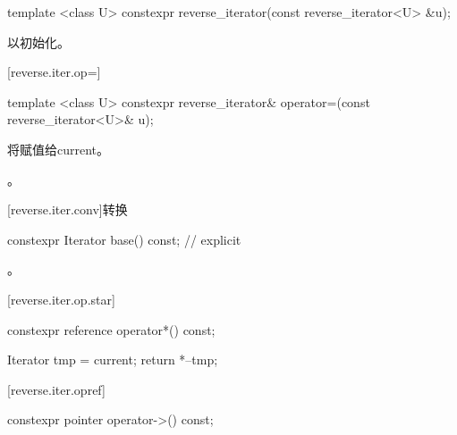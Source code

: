 \begin{itemdecl}
template <class U> constexpr reverse_iterator(const reverse_iterator<U> &u);
\end{itemdecl}

\begin{itemdescr}
\pnum
\effects
以初始化。
\end{itemdescr}

[reverse.iter.op=]{}

%
\begin{itemdecl}
template <class U>
constexpr reverse_iterator&
  operator=(const reverse_iterator<U>& u);
\end{itemdecl}

\begin{itemdescr}
\pnum
\effects
将赋值给current。

\pnum
\returns
{}。
\end{itemdescr}

[reverse.iter.conv]{转换}

%
%
\begin{itemdecl}
constexpr Iterator base() const;          // explicit
\end{itemdecl}

\begin{itemdescr}
\pnum
\returns
{}。
\end{itemdescr}

[reverse.iter.op.star]{}

%
\begin{itemdecl}
constexpr reference operator*() const;
\end{itemdecl}

\begin{itemdescr}
\pnum
\effects
\begin{codeblock}
Iterator tmp = current;
return *--tmp;
\end{codeblock}

\end{itemdescr}

[reverse.iter.opref]{}

%
\begin{itemdecl}
constexpr pointer operator->() const;
\end{itemdecl}


